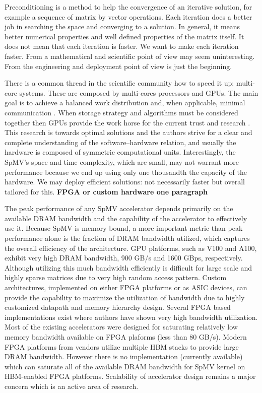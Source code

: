 \documentclass[manuscript,screen]{acmart}
\begin{document}
Preconditioning is a method to help the convergence of an iterative
solution, for example a sequence of matrix by vector operations.  Each
iteration does a better job in searching the space and converging to a
solution. In general, it means better numerical properties and well
defined properties of the matrix itself. It does not mean that each
iteration is faster.  We want to make each iteration faster. From a
mathematical and scientific point of view may seem uninteresting. From
the engineering and deployment point of view is just the beginning.

There is a common thread in the scientific community how to speed it
up: multi-core systems. These are composed by multi-cores processors
and GPUs. The main goal is to achieve a balanced work distribution
and, when applicable, minimal communication
\cite{DBLP:journals/siamsc/KayaaslanAU18,DBLP:conf/ieeehpcs/PageK18}. When
storage strategy and algorithms must be considered together then GPUs
provide the work horse for the current trust and research
\cite{DBLP:journals/topc/AnztCYDFNTTW20}. This research is towards
optimal solutions and the authors strive for a clear and complete
understanding of the software--hardware relation, and usually the
hardware is composed of symmetric computational units. Interestingly,
the SpMV's space and time complexity, which are small, may not warrant
more performance because we end up using only one thousandth the
capacity of the hardware. We may deploy efficient solutions: not
necessarily faster but overall tailored for this.  {\bf FPGA or custom
  hardware one paragraph }
  
The peak performance of any SpMV accelerator depends primarily on the available DRAM bandwidth and the capability of the accelerator to effectively use it.
Because SpMV is memory-bound, a more important metric than peak performance alone is the fraction of DRAM bandwidth utilized, which captures the overall
efficiency of the architecture. GPU platforms, such as V100 and A100, exhibit very high DRAM bandwidth, 900 GB/s and 1600 GBps, respectively. 
Although utilizing this much bandwidth efficiently is difficult for large scale and highly sparse matrices due to very high random access pattern.
Custom architectures, implemented on either FPGA platforms or as ASIC devices, can provide the capability to maximize the utilization of bandwidth due to highly customized datapath and memory hierarchy design. Several FPGA based implementations exist where authors have shown very high bandwidth utilization. 
Most of the existing accelerators were designed for saturating relatively low memory bandwidth available on FPGA plaforms (less than 80 GB/s).
Modern FPGA platforms from vendors utilize multiple HBM stacks to provide large DRAM bandwidth. However there is no implementation (currently available) which can saturate all of the available DRAM bandwidth for SpMV kernel on HBM-enabled FPGA platforms. Scalability of accelerator design remains a major concern which is an active area of research.
\end{document}
